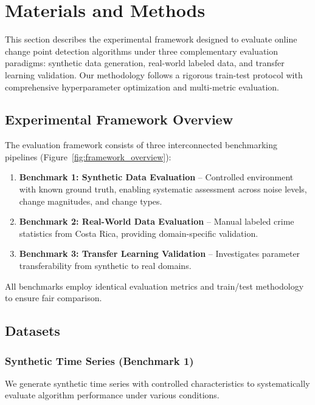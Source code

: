\section{Materials and Methods}
\label{sec:methods}

This section describes the experimental framework designed to evaluate online change point detection algorithms under three complementary evaluation paradigms: synthetic data generation, real-world labeled data, and transfer learning validation. Our methodology follows a rigorous train-test protocol with comprehensive hyperparameter optimization and multi-metric evaluation.

\subsection{Experimental Framework Overview}

The evaluation framework consists of three interconnected benchmarking pipelines (Figure~\ref{fig:framework_overview}):

\begin{enumerate}
    \item \textbf{Benchmark 1: Synthetic Data Evaluation} -- Controlled environment with known ground truth, enabling systematic assessment across noise levels, change magnitudes, and change types.
    \item \textbf{Benchmark 2: Real-World Data Evaluation} -- Manual labeled crime statistics from Costa Rica, providing domain-specific validation.
    \item \textbf{Benchmark 3: Transfer Learning Validation} -- Investigates parameter transferability from synthetic to real domains.
\end{enumerate}

All benchmarks employ identical evaluation metrics and train/test methodology to ensure fair comparison.

\subsection{Datasets}

\subsubsection{Synthetic Time Series (Benchmark 1)}
\label{sec:synthetic_data}

We generate synthetic time series with controlled characteristics to systematically evaluate algorithm performance under various conditions.

